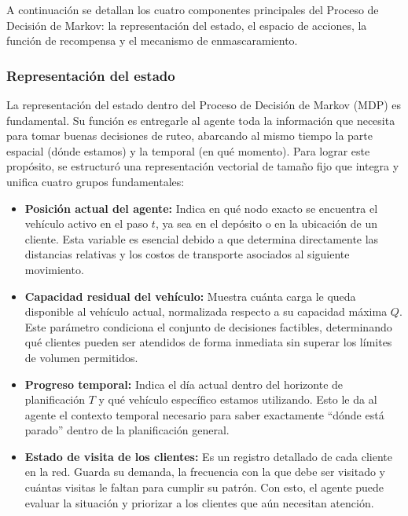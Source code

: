 

A continuación se detallan los cuatro componentes principales del Proceso de Decisión de Markov: la representación del estado, el espacio de acciones, la función de recompensa y el mecanismo de enmascaramiento.

\subsubsection{Representación del estado} \label{sec:Representaciondelestado}

La representación del estado dentro del Proceso de Decisión de Markov (MDP) es fundamental. Su función es entregarle al agente toda la información que necesita para tomar buenas decisiones de ruteo, abarcando al mismo tiempo la parte espacial (dónde estamos) y la temporal (en qué momento). Para lograr este propósito, se estructuró una representación vectorial de tamaño fijo que integra y unifica cuatro grupos fundamentales:

\begin{itemize}
    \item \textbf{Posición actual del agente:} Indica en qué nodo exacto se encuentra el vehículo activo en el paso $t$, ya sea en el depósito o en la ubicación de un cliente. Esta variable es esencial debido a que determina directamente las distancias relativas y los costos de transporte asociados al siguiente movimiento.

    \item \textbf{Capacidad residual del vehículo:} Muestra cuánta carga le queda disponible al vehículo actual, normalizada respecto a su capacidad máxima $Q$. Este parámetro condiciona el conjunto de decisiones factibles, determinando qué clientes pueden ser atendidos de forma inmediata sin superar los límites de volumen permitidos.

    \item \textbf{Progreso temporal:} Indica el día actual dentro del horizonte de planificación $T$ y qué vehículo específico estamos utilizando. Esto le da al agente el contexto temporal necesario para saber exactamente \enquote{dónde está parado} dentro de la planificación general.

    \item \textbf{Estado de visita de los clientes:} Es un registro detallado de cada cliente en la red. Guarda su demanda, la frecuencia con la que debe ser visitado y cuántas visitas le faltan para cumplir su patrón. Con esto, el agente puede evaluar la situación y priorizar a los clientes que aún necesitan atención.
\end{itemize}

